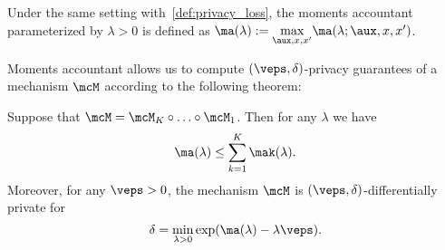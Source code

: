 \label{def:moments_accountant}
{Under the same setting with~\cref{def:privacy_loss}, the moments accountant parameterized  by $\lambda>0$ is defined as ${\ma(\lambda) := \underset{\aux, x, x'}{\max}\ma(\lambda; \aux, x, x')}$.
}

Moments accountant allows us to compute $(\veps, \delta)$-privacy guarantees of a mechanism $ \mcM $ according to the following theorem:

\label{theorem:moments_accountant_composability}
Suppose that $ \mcM = \mcM_K \circ \ldots \circ \mcM_1$. Then for any $ \lambda $ we have 
$$ \ma(\lambda) \leq \sum_{k=1}^{K} \mak (\lambda).$$ Moreover, for any $ \veps>0$, the mechanism $\mcM$ is $(\veps, \delta)$-differentially private for $$ \delta = \underset{\lambda>0}{\min} \exp(\ma(\lambda)-\lambda\veps).$$
\enthm

\iffalse 
\subsection{Sensitivity of Private Potential Selection}
\label{sec:dp_select_appendix}
We have
\begin{align}
       &\left|\hcorr_u(x;\theta) - \hcorr_u(x';\theta)\right| \nonumber \\
       =& \frac{1}{\sqrt{S}}\frac{|\sum_{s=1}^{S}g_s(u_i)\left( g_s(x_n)- g_s(x'_n) \right)|}{\sqrt{\sum_{s=1}^{S}g_s^2(u_i)}} \nonumber\\  
 =    & \frac{1}{\sqrt{S}} \frac{\left|\langle g(u_i), g(x_n) - g(x'_n) \rangle\right|}{||g(u_i) ||} \nonumber\\ 
\leq & \frac{1}{\sqrt{S}}  \frac{||g(u_i) || \cdot||g(x_n) - g(x'_n)||}{||g(u_i) ||} \nonumber\\ 
= & \frac{1}{\sqrt{S}}  ||g(x_n) - g(x'_n)|| =  \sqrt{\frac{1}{S}\sum_{s=1}^{S} \left( g_s(x_n)-g_s(x'_n)\right)^2}\nonumber\\ 
\leq &  \sqrt{ 
	\begin{aligned}
	\frac{1}{S}\sum_{s=1}^{S} & \left( \left|f_s(x_n) -\frac{1}{S}\sum_{s'=1}^{S} f_{s'}(x_n)\right| \right . \\
	&\left. +\left|f_s(x'_n) -\frac{1}{S}\sum_{s'=1}^{S} f_{s'}(x'_n)\right|\right)^2
	\end{aligned}
}. \nonumber
\end{align}

Global $L_2$ sensitivity of potential selection function  $\Delta(\hcorr)$ amounts to maximizing the above expression.
Hence, assuming $L = \underset{x_i, \theta}{\sup}f(x_i, \theta)$, we get
$ \Delta(\hcorr) = \underset{u, \theta, x,x':x\approx x'}{\max}\left|\hcorr_u(x;\theta) - \hcorr_u(x';\theta)\right|  \leq  4L$.
In the above we have used Cauchy-Schwartz and trigonometric inequality, and $ -L \leq \frac{1}{S}\sum_{s'=1}^{S} f_{s'}(x_n) \leq L$ under our assumption for boundedness of $f:\sup_{x\in\mcX, \theta \in\Theta}|f|\leq L$. 
\fi

